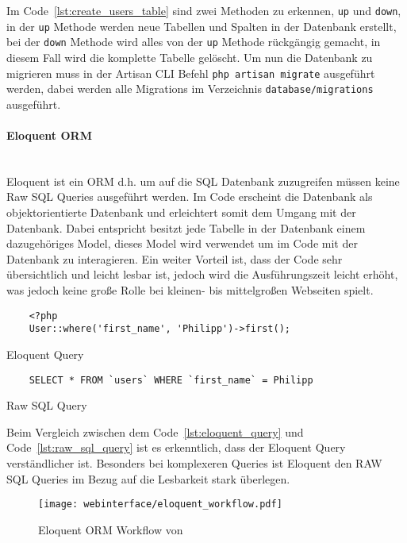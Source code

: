 Im Code~\ref{lst:create_users_table} sind zwei Methoden zu erkennen, \verb|up|
und \verb|down|, in der \verb|up| Methode werden neue Tabellen und Spalten in
der Datenbank erstellt, bei der \verb|down| Methode wird alles von der \verb|up|
Methode rückgängig gemacht, in diesem Fall wird die komplette Tabelle gelöscht.
Um nun die Datenbank zu migrieren muss in der Artisan \acs*{CLI} Befehl
\verb|php artisan migrate| ausgeführt werden, dabei werden alle Migrations im
Verzeichnis \verb|database/migrations| ausgeführt.

\paragraph{Eloquent ORM}\mbox{}\\
Eloquent ist ein \ac*{ORM} d.h. um auf die \acs*{SQL} Datenbank zuzugreifen
müssen keine Raw \acs*{SQL} Queries ausgeführt werden. Im Code erscheint die
Datenbank als objektorientierte Datenbank und erleichtert somit dem Umgang mit
der Datenbank. Dabei entspricht besitzt jede Tabelle in der Datenbank einem
dazugehöriges Model, dieses Model wird verwendet um im Code mit der Datenbank zu
interagieren. Ein weiter Vorteil ist, dass der Code sehr übersichtlich und
leicht lesbar ist, jedoch wird die Ausführungszeit leicht erhöht, was jedoch
keine große Rolle bei kleinen- bis mittelgroßen Webseiten spielt.

\begin{listing}[H]
  \begin{verbatim}
    <?php
    User::where('first_name', 'Philipp')->first();
  \end{verbatim}
  \caption{Eloquent Query}
  \label{lst:eloquent_query}
\end{listing}

\begin{listing}[H]
  \begin{verbatim}
    SELECT * FROM `users` WHERE `first_name` = Philipp
  \end{verbatim}
  \caption{Raw SQL Query}
  \label{lst:raw_sql_query}
\end{listing}

Beim Vergleich zwischen dem Code~\ref{lst:eloquent_query} und
Code~\ref{lst:raw_sql_query} ist es erkenntlich, dass der Eloquent Query
verständlicher ist. Besonders bei komplexeren Queries ist Eloquent den RAW
\acs*{SQL} Queries im Bezug auf die Lesbarkeit stark überlegen.

\begin{figure}[H]
  \centering
  \texttt{[image: webinterface/eloquent\_workflow.pdf]}
  \caption{Eloquent ORM Workflow von }
\end{figure}

